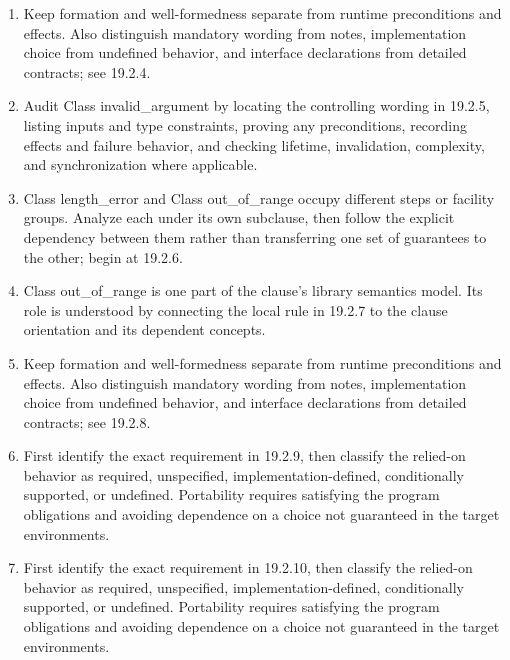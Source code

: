 \documentclass[11pt,letterpaper]{article}
\begin{document}
\begin{enumerate}
\item Keep formation and well-formedness separate from runtime preconditions and effects. Also distinguish mandatory wording from notes, implementation choice from undefined behavior, and interface declarations from detailed contracts; see 19.2.4.
\item Audit Class invalid\_\allowbreak{}argument by locating the controlling wording in 19.2.5, listing inputs and type constraints, proving any preconditions, recording effects and failure behavior, and checking lifetime, invalidation, complexity, and synchronization where applicable.
\item Class length\_\allowbreak{}error and Class out\_\allowbreak{}of\_\allowbreak{}range occupy different steps or facility groups. Analyze each under its own subclause, then follow the explicit dependency between them rather than transferring one set of guarantees to the other; begin at 19.2.6.
\item Class out\_\allowbreak{}of\_\allowbreak{}range is one part of the clause's library semantics model. Its role is understood by connecting the local rule in 19.2.7 to the clause orientation and its dependent concepts.
\item Keep formation and well-formedness separate from runtime preconditions and effects. Also distinguish mandatory wording from notes, implementation choice from undefined behavior, and interface declarations from detailed contracts; see 19.2.8.
\item First identify the exact requirement in 19.2.9, then classify the relied-on behavior as required, unspecified, implementation-defined, conditionally supported, or undefined. Portability requires satisfying the program obligations and avoiding dependence on a choice not guaranteed in the target environments.
\item First identify the exact requirement in 19.2.10, then classify the relied-on behavior as required, unspecified, implementation-defined, conditionally supported, or undefined. Portability requires satisfying the program obligations and avoiding dependence on a choice not guaranteed in the target environments.
\end{enumerate}
\end{document}
